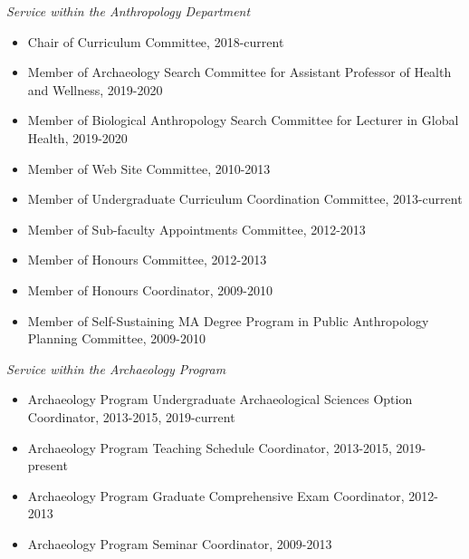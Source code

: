 
\medskip

\noindent\emph{Service within the Anthropology Department \vspace{0.01in}}

\medskip

\begin{itemize}[noitemsep, font=$\bullet$\scshape\bfseries]

\item Chair of Curriculum Committee, 2018-current 

\item Member of Archaeology Search Committee for Assistant Professor of Health and Wellness,  2019-2020 

\item Member of Biological Anthropology Search Committee for Lecturer in Global Health, 2019-2020 

\item Member of Web Site Committee, 2010-2013

\item Member of Undergraduate Curriculum Coordination Committee, 2013-current

\item Member of Sub-faculty Appointments Committee, 2012-2013

\item Member of Honours Committee, 2012-2013

\item Member of Honours Coordinator, 2009-2010

\item Member of Self-Sustaining MA Degree Program in Public Anthropology Planning Committee, 2009-2010

\end{itemize}

\medskip

\noindent\emph{Service within the Archaeology Program \vspace{0.01in}}

\medskip

\begin{itemize}[noitemsep, font=$\bullet$\scshape\bfseries]

\item Archaeology Program Undergraduate Archaeological Sciences Option Coordinator, 2013-2015, 2019-current

\item Archaeology Program Teaching Schedule Coordinator, 2013-2015, 2019-present

\item Archaeology Program Graduate Comprehensive Exam Coordinator, 2012-2013

\item Archaeology Program Seminar Coordinator, 2009-2013

\end{itemize}

